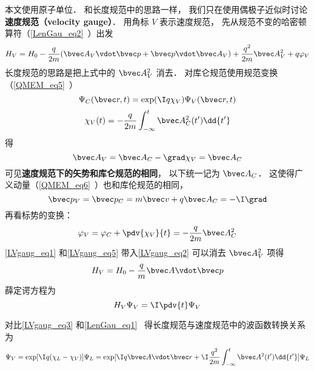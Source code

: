 

本文使用原子单位． 和长度规范中的思路一样， 我们只在使用偶极子近似时讨论\textbf{速度规范（velocity gauge）}． 用角标 $V$ 表示速度规范， 先从规范不变的哈密顿算符（\autoref{LenGau_eq2}~）出发
\begin{equation}\label{LVgaug_eq2}
H_V = H_0 - \frac{q}{2m} (\bvec A_V \vdot \bvec p + \bvec p \vdot \bvec A_V)
+ \frac{q^2}{2m} \bvec A_V^2 + q \varphi_V
\end{equation}
长度规范的思路是把上式中的 $\bvec A_V^2$ 消去． 对库仑规范使用规范变换（\autoref{QMEM_eq5}~）
\begin{equation}\label{LVgaug_eq3}
\Psi_C(\bvec r, t) = \exp(\I q\chi_V)\Psi_V(\bvec r, t)
\end{equation}
\begin{equation}\label{LVgaug_eq4}
\chi_V(t) = -\frac{q}{2m} \int_{-\infty}^t \bvec A_C^2(t') \dd{t'}
\end{equation}
得
\begin{equation}\label{LVgaug_eq1}
\bvec A_V = \bvec A_C - \grad \chi_V = \bvec A_C
\end{equation}
可见\textbf{速度规范下的矢势和库仑规范的相同}， 以下统一记为 $\bvec A_C$． 这使得广义动量（\autoref{QMEM_eq6}~）也和库伦规范的相同， 
\begin{equation}
\bvec p_V = \bvec p_C =  m \bvec v + q\bvec A_{C} = -\I \grad
\end{equation}
再看标势的变换：
\begin{equation}\label{LVgaug_eq5}
\varphi_V = \varphi_C + \pdv{\chi_V}{t} = - \frac{q}{2m} \bvec A_C^2
\end{equation}
\autoref{LVgaug_eq1} 和\autoref{LVgaug_eq5} 带入\autoref{LVgaug_eq2} 可以消去 $\bvec A_V^2$ 项得
\begin{equation}
H_V = H_0 - \frac{q}{m} \bvec A \vdot \bvec p
\end{equation}
薛定谔方程为
\begin{equation}
H_V \Psi_V = \I \pdv{t} \Psi_V
\end{equation}


对比\autoref{LVgaug_eq3} 和\autoref{LenGau_eq1}~ 得长度规范与速度规范中的波函数转换关系为
\begin{equation}\label{LVgaug_eq6}
\Psi_V = \exp[\I q(\chi_L - \chi_V)]\Psi_L = \exp[\I q \bvec A\vdot \bvec r + \I\frac{q^2}{2m}\int_{-\infty}^t \bvec A^2(t')\dd{t'}] \Psi_L
\end{equation}
